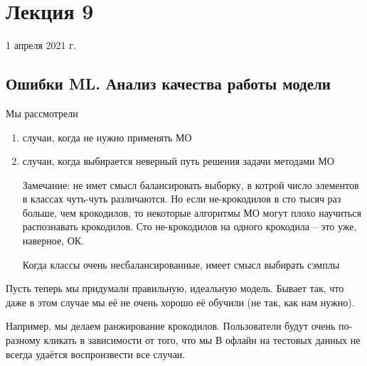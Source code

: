 \documentclass[main.tex]{subfiles}
\begin{document}
	
\section{Лекция 9}

1 апреля 2021 г.

\subsection{Ошибки ML. Анализ качества работы модели}

Мы рассмотрели

\begin{enumerate}[noitemsep]
	\item случаи, когда не нужно применять МО
	\item случаи, когда выбирается неверный путь решения задачи методами МО
	
	Замечание:
	не имет смысл балансировать выборку, в котрой число элементов в классах чуть-чуть различаются.
	Но если не-крокодилов в сто тысяч раз больше, чем крокодилов, то некоторые алгоритмы МО могут плохо научиться распознавать крокодилов.
	Сто не-крокодилов на одного крокодила -- это уже, наверное, ОК.
	
	Когда классы очень несбалансированные, имеет смысл выбирать сэмплы 
	  
\end{enumerate}

Пусть теперь мы придумали правильную, идеальную модель.
Бывает так, что даже в этом случае мы её не очень хорошо её обучили (не так, как нам нужно).

Например, мы делаем ранжирование крокодилов.
Пользователи будут очень по-разному кликать в зависимости от того, что мы
В офлайн на тестовых данных не всегда удаётся воспроизвести все случаи.
\end{document}
